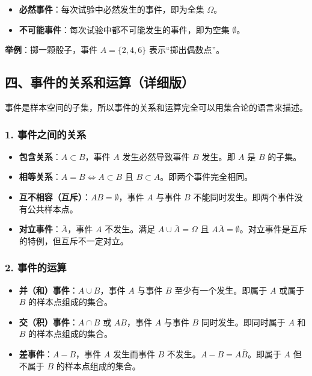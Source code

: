 \documentclass[12pt,a4paper]{ctexart}
\begin{document}
\begin{itemize}[noitemsep]
    \item \textbf{必然事件}：每次试验中必然发生的事件，即为全集 $\Omega$。
    \item \textbf{不可能事件}：每次试验中都不可能发生的事件，即为空集 $\emptyset$。
\end{itemize}

\textbf{举例}：掷一颗骰子，事件 $A = \{2,4,6\}$ 表示“掷出偶数点”。

\subsection{四、事件的关系和运算（详细版）}

事件是样本空间的子集，所以事件的关系和运算完全可以用集合论的语言来描述。

\subsubsection{1. 事件之间的关系}
\begin{itemize}[noitemsep]
    \item \textbf{包含关系}：$A \subset B$，事件 $A$ 发生必然导致事件 $B$ 发生。即 $A$ 是 $B$ 的子集。
    \item \textbf{相等关系}：$A = B \iff A \subset B$ 且 $B \subset A$。即两个事件完全相同。
    \item \textbf{互不相容（互斥）}：$AB = \emptyset$，事件 $A$ 与事件 $B$ 不能同时发生。即两个事件没有公共样本点。
    \item \textbf{对立事件}：$\bar{A}$，事件 $A$ 不发生。满足 $A \cup \bar{A} = \Omega$ 且 $A\bar{A} = \emptyset$。对立事件是互斥的特例，但互斥不一定对立。
\end{itemize}

\subsubsection{2. 事件的运算}
\begin{itemize}[noitemsep]
    \item \textbf{并（和）事件}：$A \cup B$，事件 $A$ 与事件 $B$ 至少有一个发生。即属于 $A$ 或属于 $B$ 的样本点组成的集合。
    \item \textbf{交（积）事件}：$A \cap B$ 或 $AB$，事件 $A$ 与事件 $B$ 同时发生。即同时属于 $A$ 和 $B$ 的样本点组成的集合。
    \item \textbf{差事件}：$A - B$，事件 $A$ 发生而事件 $B$ 不发生。$A - B = A\bar{B}$。即属于 $A$ 但不属于 $B$ 的样本点组成的集合。
\end{itemize}
\end{document}
